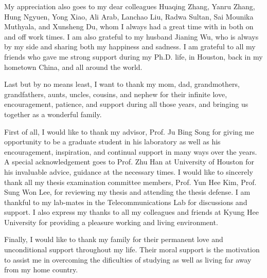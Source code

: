 \documentclass[11pt,ECE_Dissertation_Style]{report}
\numberwithin{algorithm}{chapter}
\begin{document}
\par My appreciation also goes to my dear colleagues Huaqing Zhang, Yanru Zhang, Hung Ngyuen, Yong Xiao, Ali Arab, Lanchao Liu, Radwa Sultan, Sai Mounika Muthyala, and Xunsheng Du, whom I always had a great time with in both on and off work times. I am also grateful to my husband Jianing Wu, who is always by my side and sharing both my happiness and sadness. I am grateful to all my friends who gave me strong support during my Ph.D. life, in Houston, back in my hometown China, and all around the world. 

\par Last but by no means least, I want to thank my mom, dad, grandmothers, grandfathers, aunts, uncles, cousins, and nephew for their infinite love, encouragement, patience, and support during all those years, and bringing us together as a wonderful family. 

First of all, I would like to thank my advisor, Prof. Ju Bing Song for giving me opportunity
to be a graduate student in his laboratory as well as his encouragement, inspiration, and
continual support in many ways over the years. A special acknowledgement goes to Prof.
Zhu Han at University of Houston for his invaluable advice, guidance at the necessary
times.
I would like to sincerely thank all my thesis examination committee members, Prof.
Yun Hee Kim, Prof. Sung Won Lee, for reviewing my thesis and attending the thesis
defense.
I am thankful to my lab-mates in the Telecommunications Lab for discussions and
support. I also express my thanks to all my colleagues and friends at Kyung Hee University
for providing a pleasure working and living environment.

\par Finally, I would like to thank my family for their permanent love and unconditional support throughout my life. Their moral support is the motivation to assist me in overcoming the dificulties of studying as well as living far away from my home country.



\newpage
\abstitlep
{}
\abstractsection


\end{document}
